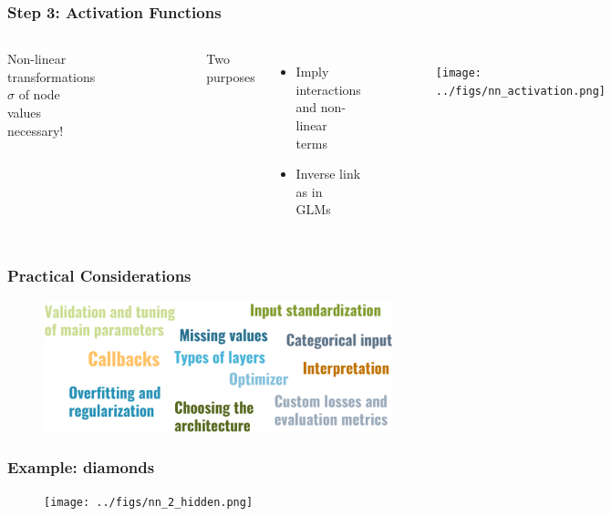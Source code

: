 \documentclass[
    utf8,
    aspectratio=169
]{beamer}  %
\begin{document}
\begin{frame}
\frametitle{Step 3: Activation Functions}
\begin{columns}
	Non-linear transformations $\sigma$ of node values necessary!
		\begin{figure}
		\includegraphics[width=0.98\textwidth]{pics/activation_functions.png}
	\end{figure}
	Two purposes
	\begin{itemize}
		\item Imply interactions and non-linear terms
		\item Inverse link as in GLMs
	\end{itemize}
	\begin{example}
	\end{example}
	\begin{figure}
		\texttt{[image: ../figs/nn\_activation.png]}
	\end{figure}
\end{columns}
\end{frame}

\begin{frame}
\frametitle{Practical Considerations}
\begin{figure}
	\includegraphics[width=0.9\textwidth]{pics/nn_practical.png}
\end{figure}
\end{frame}

\begin{frame}
\frametitle{Example: diamonds}
\begin{figure}
	\texttt{[image: ../figs/nn\_2\_hidden.png]}
\end{figure}
\end{frame}
\end{document}
